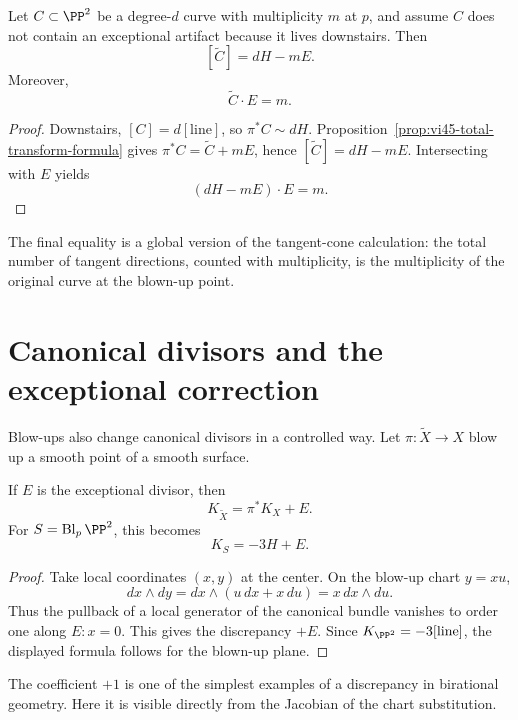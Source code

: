 \begin{proposition}\label{prop:vi45-strict-class}
Let \(C\subset\PP^2\) be a degree-\(d\) curve with multiplicity \(m\) at \(p\), and assume \(C\) does not contain an exceptional artifact because it lives downstairs.  Then
\[
  [\widetilde C]=dH-mE.
\]
Moreover,
\[
  \widetilde C\cdot E=m.
\]
\end{proposition}

\begin{proof}
Downstairs, \([C]=d[\text{line}]\), so \(\pi^*C\sim dH\).  Proposition~\ref{prop:vi45-total-transform-formula} gives \(\pi^*C=\widetilde C+mE\), hence \([\widetilde C]=dH-mE\).  Intersecting with \(E\) yields
\[
  (dH-mE)\cdot E=m.
\]
\end{proof}

The final equality is a global version of the tangent-cone calculation: the total number of tangent directions, counted with multiplicity, is the multiplicity of the original curve at the blown-up point.

\section{Canonical divisors and the exceptional correction}

Blow-ups also change canonical divisors in a controlled way.  Let \(\pi:\widetilde X\to X\) blow up a smooth point of a smooth surface.

\begin{theorem}\label{thm:vi45-canonical-class}
If \(E\) is the exceptional divisor, then
\[
  \boxed{K_{\widetilde X}=\pi^*K_X+E.}
\]
For \(S=\Bl_p\PP^2\), this becomes
\[
  K_S=-3H+E.
\]
\end{theorem}

\begin{proof}
Take local coordinates \((x,y)\) at the center.  On the blow-up chart \(y=xu\),
\[
  dx\wedge dy
  =dx\wedge(u\,dx+x\,du)
  =x\,dx\wedge du.
\]
Thus the pullback of a local generator of the canonical bundle vanishes to order one along \(E:x=0\).  This gives the discrepancy \(+E\).  Since \(K_{\PP^2}=-3[\text{line}]\), the displayed formula follows for the blown-up plane.
\end{proof}

The coefficient \(+1\) is one of the simplest examples of a discrepancy in birational geometry.  Here it is visible directly from the Jacobian of the chart substitution.

